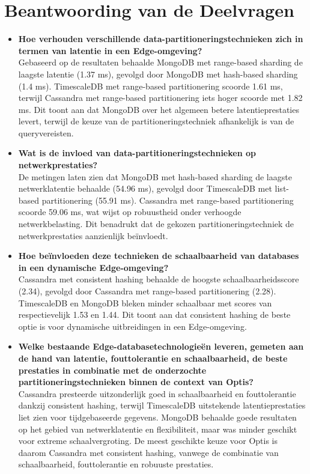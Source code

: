 \section{Beantwoording van de Deelvragen}
\begin{itemize}
    \item \textbf{Hoe verhouden verschillende data-partitioneringstechnieken zich in termen van latentie in een Edge-omgeving?} \\
    Gebaseerd op de resultaten behaalde MongoDB met range-based sharding de laagste latentie (1.37 ms), gevolgd door MongoDB met hash-based sharding (1.4 ms). TimescaleDB met range-based partitionering scoorde 1.61 ms, terwijl Cassandra met range-based partitionering iets hoger scoorde met 1.82 ms. Dit toont aan dat MongoDB over het algemeen betere latentieprestaties levert, terwijl de keuze van de partitioneringstechniek afhankelijk is van de queryvereisten.

    \item \textbf{Wat is de invloed van data-partitioneringstechnieken op netwerkprestaties?} \\
    De metingen laten zien dat MongoDB met hash-based sharding de laagste netwerklatentie behaalde (54.96 ms), gevolgd door TimescaleDB met list-based partitionering (55.91 ms). Cassandra met range-based partitionering scoorde 59.06 ms, wat wijst op robuustheid onder verhoogde netwerkbelasting. Dit benadrukt dat de gekozen partitioneringstechniek de netwerkprestaties aanzienlijk beïnvloedt.

    \item \textbf{Hoe beïnvloeden deze technieken de schaalbaarheid van databases in een dynamische Edge-omgeving?} \\
    Cassandra met consistent hashing behaalde de hoogste schaalbaarheidsscore (2.34), gevolgd door Cassandra met range-based partitionering (2.28). TimescaleDB en MongoDB bleken minder schaalbaar met scores van respectievelijk 1.53 en 1.44. Dit toont aan dat consistent hashing de beste optie is voor dynamische uitbreidingen in een Edge-omgeving.

    \item \textbf{Welke bestaande Edge-databasetechnologieën leveren, gemeten aan de hand van latentie, fouttolerantie en schaalbaarheid, de beste prestaties in combinatie met de onderzochte partitioneringstechnieken binnen de context van Optis?} \\
    Cassandra presteerde uitzonderlijk goed in schaalbaarheid en fouttolerantie dankzij consistent hashing, terwijl TimescaleDB uitstekende latentieprestaties liet zien voor tijdgebaseerde gegevens. MongoDB behaalde goede resultaten op het gebied van netwerklatentie en flexibiliteit, maar was minder geschikt voor extreme schaalvergroting. De meest geschikte keuze voor Optis is daarom Cassandra met consistent hashing, vanwege de combinatie van schaalbaarheid, fouttolerantie en robuuste prestaties.
\end{itemize}